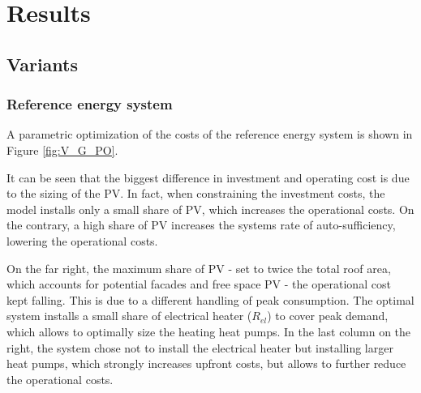 \documentclass{article}
\begin{document}


\section{Results}

\subsection{Variants}

\subsubsection{Reference energy system}
A parametric optimization of the costs of the reference energy system is shown in Figure \ref{fig:V_G_PO}.

It can be seen that the biggest difference in investment and operating cost is due to the sizing of the PV. In fact, when constraining the investment costs, the model installs only a small share of PV, which increases the operational costs. On the contrary, a high share of PV increases the systems rate of auto-sufficiency, lowering the operational costs. 

On the far right, the maximum share of PV - set to twice the total roof area, which accounts for potential facades and free space PV - the operational cost kept falling. This is due to a different handling of peak consumption. The optimal system installs a small share of electrical heater ($R_{el}$) to cover peak demand, which allows to optimally size the heating heat pumps. In the last column on the right, the system chose not to install the electrical heater but installing larger heat pumps, which strongly increases upfront costs, but allows to further reduce the operational costs.
\end{document}
